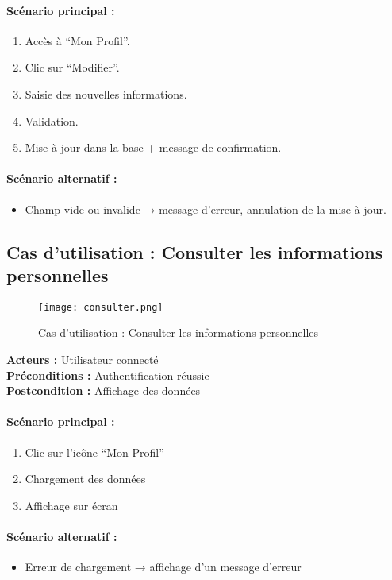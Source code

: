 \documentclass[12pt,a4paper]{report}
\begin{document}
\paragraph{Scénario principal :}
\begin{enumerate}
    \item Accès à “Mon Profil”.
    \item Clic sur “Modifier”.
    \item Saisie des nouvelles informations.
    \item Validation.
    \item Mise à jour dans la base + message de confirmation.
\end{enumerate}

\paragraph{Scénario alternatif :}
\begin{itemize}
    \item Champ vide ou invalide → message d’erreur, annulation de la mise à jour.
\end{itemize}

\subsection{Cas d’utilisation : Consulter les informations personnelles}
\begin{figure}[H] 
    \centering
    \texttt{[image: consulter.png]}
    \caption{Cas d'utilisation : Consulter les informations personnelles }
    \label{fig:consulterSprint1}
\end{figure}
\textbf{Acteurs :} Utilisateur connecté \\
\textbf{Préconditions :} Authentification réussie \\
\textbf{Postcondition :} Affichage des données

\paragraph{Scénario principal :}
\begin{enumerate}
    \item Clic sur l’icône “Mon Profil”
    \item Chargement des données
    \item Affichage sur écran
\end{enumerate}

\paragraph{Scénario alternatif :}
\begin{itemize}
    \item Erreur de chargement → affichage d’un message d’erreur
\end{itemize}
\end{document}
